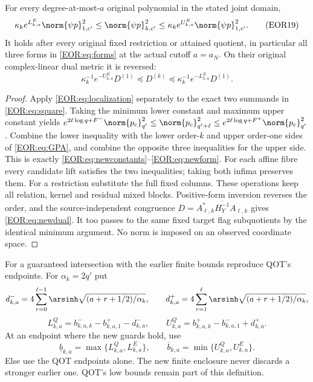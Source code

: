 \documentclass[11pt,a4paper]{article}
\begin{document}
\begin{QOTtheorem}
For every degree-at-most-$a$ original polynomial in the stated joint domain,
\begin{equation}
 \kappa_k e^{L_{k,a}^{E}}\norm{\psi p}_{1,c'}^2
 \le \norm{\psi p}_{k,c'}^2
 \le\kappa_k e^{U_{k,a}^{E}}\norm{\psi p}_{1,c'}^2.
 \label{EOR:eq:newform}
\tag{EOR19}
\end{equation}
It holds after every original fixed restriction or attained quotient, in
particular all three forms in \eqref{EOR:eq:forms} at the actual cutoff $a=a_N$.
On their original complex-linear dual metric it is reversed:
\begin{equation}
 \kappa_k^{-1}e^{-U_{k,a}^{E}}D^{(1)}
 \preceq D^{(k)}\preceq
 \kappa_k^{-1}e^{-L_{k,a}^{E}}D^{(1)}.
 \label{EOR:eq:newdual}
\tag{EOR20}
\end{equation}
\end{QOTtheorem}
\begin{proof}
Apply \eqref{EOR:eq:localization} separately to the exact two summands in
\eqref{EOR:eq:square}. Taking the minimum lower constant and maximum upper constant
yields
$e^{2\ell\log q+F^-}\norm{p_c}_{q'}^2
\le\norm{p_c}_{q'+\ell}^2
\le e^{2\ell\log q+F^+}\norm{p_c}_{q'}^2$.
Combine the lower inequality with the lower order-$k$ and upper order-one sides
of \eqref{EOR:eq:GPA}, and combine the opposite three inequalities for the upper side.
This is exactly \eqref{EOR:eq:newconstants}--\eqref{EOR:eq:newform}.
For each affine fibre every candidate lift satisfies the two inequalities;
taking both infima preserves them. For a restriction substitute the full fixed
columns. These operations keep all relation, kernel and residual mixed blocks.
Positive-form inversion reverses the order, and the source-independent congruence
$D=A_{\ell,k}^*\overline{H_Y^{-1}}A_{\ell,k}$ gives \eqref{EOR:eq:newdual}.
It too passes to the same fixed target flag subquotients by the identical
minimum argument. No norm is imposed on an observed coordinate space.
\end{proof}

For a guaranteed intersection with the earlier finite bounds reproduce QOT's
endpoints. For $\alpha_k=2q'$ put
\[
 d^-_{k,a}=4\sum_{r=0}^{\ell-1}\arsinh\sqrt{(a+r+1/2)/\alpha_k},\qquad
 d^+_{k,a}=4\sum_{r=1}^{\ell}\arsinh\sqrt{(a+r+1/2)/\alpha_k},
\]
\[
 L_{k,a}^{Q}=b^-_{k,a,k}-b^+_{k,a,1}-d^-_{k,a},\qquad
 U_{k,a}^{Q}=b^+_{k,a,k}-b^-_{k,a,1}+d^+_{k,a}.
\]
At an endpoint where the new guards hold, use
\begin{equation}
 \underline b_{k,a}=\max\{L_{k,a}^Q,L_{k,a}^E\},\qquad
 \overline b_{k,a}=\min\{U_{k,a}^Q,U_{k,a}^E\}.
 \label{EOR:eq:intersection}
\tag{EOR21}
\end{equation}
Else use the QOT endpoints alone. The new finite enclosure never discards a
stronger earlier one. QOT's low bounds remain part of this definition.
\end{document}
